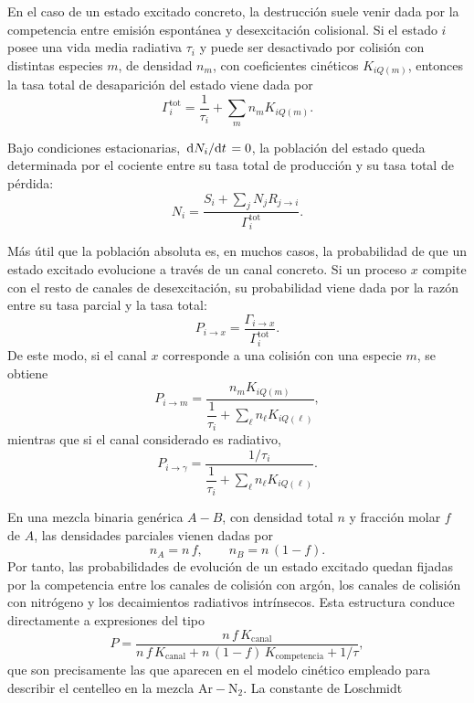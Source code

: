 \documentclass[12pt,a4paper]{article}
\newcommand{\N}{\mathrm{N}}
\newcommand{\Ar}{\mathrm{Ar}}
\begin{document}
En el caso de un estado excitado concreto, la destrucción suele venir dada por la competencia entre emisión espontánea y desexcitación colisional. Si el estado \(i\) posee una vida media radiativa \(\tau_i\) y puede ser desactivado por colisión con distintas especies \(m\), de densidad \(n_m\), con coeficientes cinéticos \(K_{iQ(m)}\), entonces la tasa total de desaparición del estado viene dada por
\begin{equation}
    \Gamma_i^{\text{tot}}
    =
    \frac{1}{\tau_i}
    +
    \sum_m n_m K_{iQ(m)}.
    \label{eq:total_loss_rate}
\end{equation}

Bajo condiciones estacionarias, \(\dv*{N_i}{t}=0\), la población del estado queda determinada por el cociente entre su tasa total de producción y su tasa total de pérdida:
\begin{equation}
    N_i
    =
    \frac{S_i + \sum_j N_j R_{j\to i}}
    {\Gamma_i^{\text{tot}}}.
    \label{eq:stationary_population}
\end{equation}

Más útil que la población absoluta es, en muchos casos, la probabilidad de que un estado excitado evolucione a través de un canal concreto. Si un proceso \(x\) compite con el resto de canales de desexcitación, su probabilidad viene dada por la razón entre su tasa parcial y la tasa total:
\begin{equation}
    P_{i\to x}
    =
    \frac{\Gamma_{i\to x}}
    {\Gamma_i^{\text{tot}}}.
    \label{eq:branching_ratio_general}
\end{equation}
De este modo, si el canal \(x\) corresponde a una colisión con una especie \(m\), se obtiene
\begin{equation}
    P_{i\to m}
    =
    \frac{n_m K_{iQ(m)}}
    {\dfrac{1}{\tau_i} + \sum_\ell n_\ell K_{iQ(\ell)}},
    \label{eq:branching_collision}
\end{equation}
mientras que si el canal considerado es radiativo,
\begin{equation}
    P_{i\to \gamma}
    =
    \frac{1/\tau_i}
    {\dfrac{1}{\tau_i} + \sum_\ell n_\ell K_{iQ(\ell)}}.
    \label{eq:branching_radiative}
\end{equation}

En una mezcla binaria genérica \(A-B\), con densidad total \(n\) y fracción molar \(f\) de \(A\), las densidades parciales vienen dadas por
\begin{equation}
    n_{A}=n\,f,
    \qquad
    n_{B}=n\,(1-f).
\end{equation}
Por tanto, las probabilidades de evolución de un estado excitado quedan fijadas por la competencia entre los canales de colisión con argón, los canales de colisión con nitrógeno y los decaimientos radiativos intrínsecos. Esta estructura conduce directamente a expresiones del tipo
\begin{equation}
    P
    =
    \frac{n\,f\,K_{\text{canal}}}
    {n\,f\,K_{\text{canal}}
    +
    n\,(1-f)\,K_{\text{competencia}}
    +
    1/\tau},
    \label{eq:generic_probability_binary_mixture}
\end{equation}
que son precisamente las que aparecen en el modelo cinético empleado para describir el centelleo en la mezcla $\Ar-\N_2$. La constante de Loschmidt 
\end{document}
